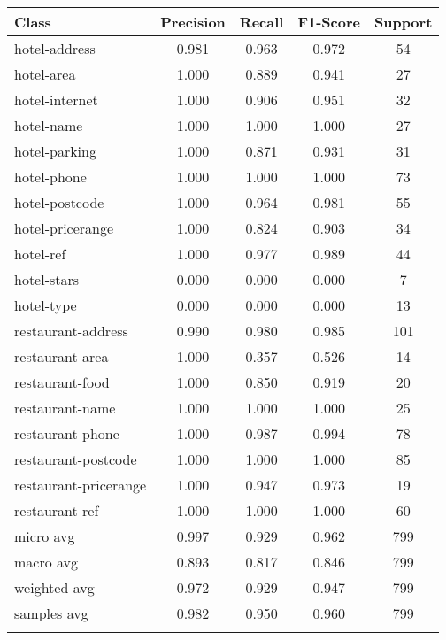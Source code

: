 
\begin{table}[H]
\centering

\begin{tabular}{|l|c|c|c|c|}
\hline
\textbf{Class}& \textbf{Precision} & \textbf{Recall} & \textbf{F1-Score} & \textbf{Support} \\ \hline
hotel-address & 0.981 & 0.963 & 0.972 & 54 \\ \hline
hotel-area & 1.000 & 0.889 & 0.941 & 27 \\ \hline
hotel-internet & 1.000 & 0.906 & 0.951 & 32 \\ \hline
hotel-name & 1.000 & 1.000 & 1.000 & 27 \\ \hline
hotel-parking & 1.000 & 0.871 & 0.931 & 31 \\ \hline
hotel-phone & 1.000 & 1.000 & 1.000 & 73 \\ \hline
hotel-postcode & 1.000 & 0.964 & 0.981 & 55 \\ \hline
hotel-pricerange & 1.000 & 0.824 & 0.903 & 34 \\ \hline
hotel-ref & 1.000 & 0.977 & 0.989 & 44 \\ \hline
hotel-stars & 0.000 & 0.000 & 0.000 & 7 \\ \hline
hotel-type & 0.000 & 0.000 & 0.000 & 13 \\ \hline
restaurant-address & 0.990 & 0.980 & 0.985 & 101 \\ \hline
restaurant-area & 1.000 & 0.357 & 0.526 & 14 \\ \hline
restaurant-food & 1.000 & 0.850 & 0.919 & 20 \\ \hline
restaurant-name & 1.000 & 1.000 & 1.000 & 25 \\ \hline
restaurant-phone & 1.000 & 0.987 & 0.994 & 78 \\ \hline
restaurant-postcode & 1.000 & 1.000 & 1.000 & 85 \\ \hline
restaurant-pricerange & 1.000 & 0.947 & 0.973 & 19 \\ \hline
restaurant-ref & 1.000 & 1.000 & 1.000 & 60 \\ \hline\hline
micro avg & 0.997 & 0.929 & 0.962 & 799 \\ \hline
macro avg & 0.893 & 0.817 & 0.846 & 799 \\ \hline
weighted avg & 0.972 & 0.929 & 0.947 & 799 \\ \hline
samples avg & 0.982 & 0.950 & 0.960 & 799 \\ \hline
\multicolumn{5}{c}{}\\ \hline


\end{tabular}
\end{table}
